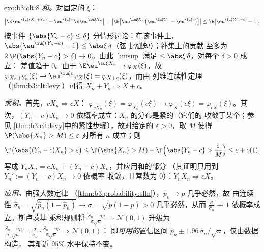 \begin{solution}{exo:b3:clt:8}
\emph{和。}对固定的 $\xi$：
\[
\bigl|\E\eu^{\iu\xi(X_n+Y_n)} -
\eu^{\iu\xi c}\,\E\eu^{\iu\xi X_n}\bigr|
= \bigl|\E\bigl[\eu^{\iu\xi X_n}\bigl(\eu^{\iu\xi Y_n} -
\eu^{\iu\xi c}\bigr)\bigr]\bigr|
\leq \E\bigl|\eu^{\iu\xi(Y_n - c)} - 1\bigr| .
\]
按事件 $\{\abs{Y_n - c} \leq \delta\}$ 分情形讨论：在该事件上，
$\abs{\eu^{\iu\xi(Y_n-c)} - 1} \leq \abs\xi\,\delta$（弦
比弧短）；补集上的贡献
至多为 $2\,\P(\abs{Y_n - c} > \delta) \to 0$。由此
$\limsup$ 满足 $\leq \abs\xi\,\delta$，对每个 $\delta > 0$ 成立：
差值趋于 $0$。由于 $\E\eu^{\iu\xi X_n} \to
\varphi_X(\xi)$，故 $\varphi_{X_n+Y_n}(\xi) \to
\eu^{\iu\xi c}\varphi_X(\xi) = \varphi_{X+c}(\xi)$，而由
列维连续性定理（\cref{thm:b3:clt:levy}）可得 $X_n + Y_n
\Rightarrow X + c$。

\emph{乘积。}首先，$cX_n \Rightarrow cX$：
$\varphi_{cX_n}(\xi) = \varphi_{X_n}(c\xi) \to
\varphi_X(c\xi) = \varphi_{cX}(\xi)$。其次，$(Y_n - c)X_n
\to 0$ 依概率成立：$X_n$ 的分布是紧的（它们的
收敛于某个；参见
\cref{thm:b3:clt:levy}中的紧性步骤），故对给定的 $\varepsilon > 0$，取 $M$
使得 $\P(\abs{X_n} > M) \leq \varepsilon$ 对所有 $n$ 成立；则
\[
\P\bigl(\abs{(Y_n - c)X_n} > \varepsilon\bigr) \leq
\P(\abs{X_n} > M) + \P\Bigl(\abs{Y_n - c} >
\frac{\varepsilon}{M}\Bigr) \leq \varepsilon + o(1) .
\]
写成 $Y_nX_n = cX_n + (Y_n - c)X_n$，并应用和的部分
（其证明只用到 $Y_n' := (Y_n - c)X_n \to 0$ 依概率
收敛，且常数为 $0$）：$Y_nX_n \Rightarrow cX$。

\emph{应用。}由强大数定律
（\cref{thm:b3:probability:slln}），$\hat p_n \to p$ 几乎必然，故
由连续性 $\hat\sigma_n = \sqrt{\hat p_n(1 - \hat p_n)}
\to \sigma = \sqrt{p(1 - p)} > 0$ 几乎必然，从而
$\frac{\sigma}{\hat\sigma_n} \to 1$ 依概率成立。斯卢茨基
乘积规则将 $\frac{S_n - np}{\sigma\sqrt n}
\Rightarrow \mathcal N(0,1)$ 升级为 $\frac{S_n -
np}{\hat\sigma_n\sqrt n} = \frac{\sigma}{\hat\sigma_n}\cdot
\frac{S_n - np}{\sigma\sqrt n} \Rightarrow \mathcal N(0,1)$：
即\emph{可用的}置信区间 $\hat p_n \pm
1.96\,\hat\sigma_n/\sqrt n$，仅由数据构造，
其渐近 $95\%$ 水平保持不变。
\end{solution}

